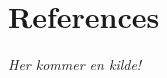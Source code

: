 \section*{References}

\begin{thebibliography}{99}
    \emph{Her kommer en kilde! }

\end{thebibliography}
